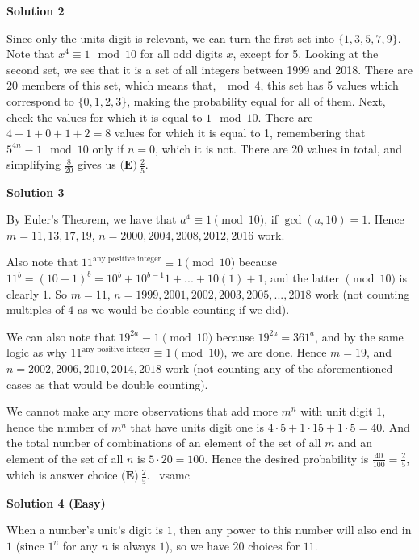 \begin{enumerate}
\textbf{Solution 2}

Since only the units digit is relevant, we can turn the first set into $\{1,3,5,7,9\}$. Note that $x^4 \equiv 1 \mod 10$ for all odd digits $x$, except for 5. Looking at the second set, we see that it is a set of all integers between 1999 and 2018. There are 20 members of this set, which means that, $\mod 4$, this set has 5 values which correspond to $\{0,1,2,3\}$, making the probability equal for all of them. Next, check the values for which it is equal to $1 \mod 10$. There are $4+1+0+1+2=8$ values for which it is equal to 1, remembering that $5^{4n} \equiv 1 \mod 10$ only if $n=0$, which it is not. There are 20 values in total, and simplifying $\frac{8}{20}$ gives us $\boxed{\textbf{(E)} ~\frac{2}{5}}$.

 



\textbf{Solution 3}

By Euler's Theorem, we have that $a^{4} \equiv 1 \pmod {10}$, if $\gcd(a,10)=1$. Hence $m=11,13,17,19$, $n=2000,2004,2008,2012,2016$ work. 

 Also note that $11^{\text{any positive integer}}\equiv 1 \pmod {10}$ because $11^b=(10+1)^b=10^b+10^{b-1}1+...+10(1)+1$, and the latter $\pmod {10}$ is clearly $1$. So $m=11$, $n=1999,2001,2002,2003,2005,...,2018$ work (not counting multiples of 4 as we would be double counting if we did). 

 We can also note that $19^{2a}\equiv 1 \pmod {10}$ because $19^{2a}=361^{a}$, and by the same logic as why $11^{\text{any positive integer}}\equiv 1 \pmod {10}$, we are done. Hence $m=19$, and $n=2002, 2006, 2010, 2014, 2018$ work (not counting any of the aforementioned cases as that would be double counting). 

 We cannot make any more observations that add more $m^n$ with unit digit $1$, hence the number of $m^n$ that have units digit one is $4\cdot 5+1\cdot 15+1\cdot 5=40$. And the total number of combinations of an element of the set of all $m$ and an element of the set of all $n$ is $5\cdot 20=100$. Hence the desired probability is $\frac{40}{100}=\frac{2}{5}$, which is answer choice $\boxed{\textbf{(E)} ~\frac{2}{5}}$. ~vsamc

 



\textbf{Solution 4 (Easy)}

When a number's unit's digit is $1$, then any power to this number will also end in $1$ (since $1^{n}$ for any $n$ is always $1$), so we have $20$ choices for $11$.


\end{enumerate}
